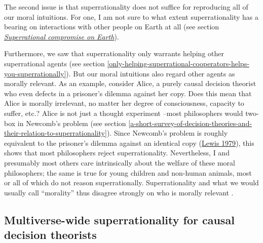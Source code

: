 The second issue is that superrationality does not suffice for
reproducing all of our moral intuitions. For one, I am not sure to what
extent superrationality has a bearing on interactions with other people
on Earth at all (see section
\protect\hyperlink{_hbp3s2xblhpq}{\emph{Superrational compromise on
Earth}}).

Furthermore, we saw that superrationality only warrants helping other
superrational agents (see section
\ref{only-helping-superrational-cooperators-helps-you-superrationally}). But
our moral intuitions also regard other agents as morally relevant. As an
example, consider Alice, a purely causal decision theorist who even
defects in a prisoner's dilemma against her copy. Does this mean that
Alice is morally irrelevant, no matter her degree of consciousness,
capacity to suffer, etc.? Alice is not just a thought experiment --most
philosophers would two-box in Newcomb's problem (see section
\ref{a-short-survey-of-decision-theories-and-their-relation-to-superrationality}). Since Newcomb's problem is roughly equivalent to
the prisoner's dilemma against an identical copy
(\href{https://sl4librarian.files.wordpress.com/2017/01/lewis-prisoners-dilemma-newcomb-problem.pdf}{Lewis
1979}), this shows that most philosophers reject superrationality.
Nevertheless, I and presumably most others care intrinsically about the
welfare of these moral philosophers; the same is true for young children
and non-human animals, most or all of which do not reason
superrationally. Superrationality and what we would usually call
``morality'' thus disagree strongly on who is morally relevant
\parencite[][sections 7.2.2 and 7.2.3]{Drescher2006-ky}.

\hypertarget{multiverse-wide-superrationality-for-causal-decision-theorists}{\subsection{Multiverse-wide
superrationality for causal decision
theorists}\label{multiverse-wide-superrationality-for-causal-decision-theorists}}

